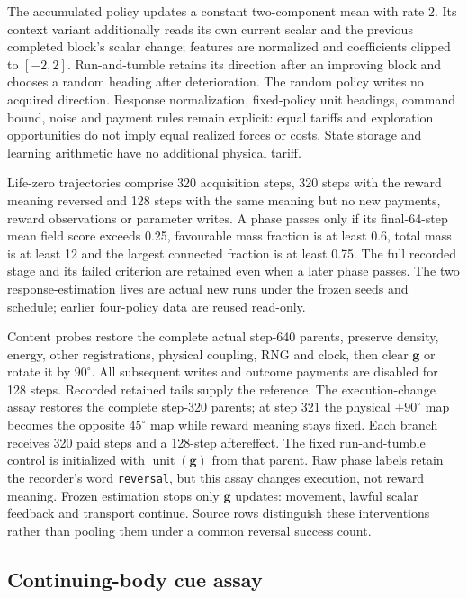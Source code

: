 The accumulated policy updates a constant two-component mean with rate 2. Its context variant additionally reads its own current scalar and the previous completed block's scalar change; features are normalized and coefficients clipped to $[-2,2]$. Run-and-tumble retains its direction after an improving block and chooses a random heading after deterioration. The random policy writes no acquired direction. Response normalization, fixed-policy unit headings, command bound, noise and payment rules remain explicit: equal tariffs and exploration opportunities do not imply equal realized forces or costs. State storage and learning arithmetic have no additional physical tariff.

Life-zero trajectories comprise 320 acquisition steps, 320 steps with the reward meaning reversed and 128 steps with the same meaning but no new payments, reward observations or parameter writes. A phase passes only if its final-64-step mean field score exceeds 0.25, favourable mass fraction is at least 0.6, total mass is at least 12 and the largest connected fraction is at least 0.75. The full recorded stage and its failed criterion are retained even when a later phase passes. The two response-estimation lives are actual new runs under the frozen seeds and schedule; earlier four-policy data are reused read-only. 

Content probes restore the complete actual step-640 parents, preserve density, energy, other registrations, physical coupling, RNG and clock, then clear $\boldsymbol g$ or rotate it by $90^\circ$. All subsequent writes and outcome payments are disabled for 128 steps. Recorded retained tails supply the reference. The execution-change assay restores the complete step-320 parents; at step 321 the physical $\pm90^\circ$ map becomes the opposite $45^\circ$ map while reward meaning stays fixed. Each branch receives 320 paid steps and a 128-step aftereffect. The fixed run-and-tumble control is initialized with $\operatorname{unit}(\boldsymbol g)$ from that parent. Raw phase labels retain the recorder's word \texttt{reversal}, but this assay changes execution, not reward meaning. Frozen estimation stops only $\boldsymbol g$ updates: movement, lawful scalar feedback and transport continue. Source rows distinguish these interventions rather than pooling them under a common reversal success count.

\subsection*{Continuing-body cue assay}

